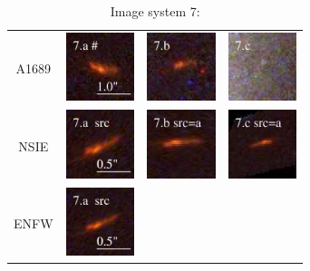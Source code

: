 \documentclass[useAMS,usenatbib]{mn2e}
\begin{document}
\begin{table}
  \caption{Image system 7:}\vspace{0mm}
  \begin{tabular}{cccc}
    \multicolumn{1}{m{1cm}}{{\Large A1689}}
    & \multicolumn{1}{m{1.7cm}}{\includegraphics[height=2.00cm,clip]{figs/nsie_img/rgb.img_7_a.ps}}
    & \multicolumn{1}{m{1.7cm}}{\includegraphics[height=2.00cm,clip]{figs/nsie_img/rgb.img_7_b.ps}}
    & \multicolumn{1}{m{1.7cm}}{\includegraphics[height=2.00cm,clip]{figs/nsie_img/rgb.img_7_c.ps}} \\
    \multicolumn{1}{m{1cm}}{{\Large NSIE}}
    & \multicolumn{1}{m{1.7cm}}{\includegraphics[height=2.00cm,clip]{figs/nsie_img/rgb.src_7_a.ps}}
    & \multicolumn{1}{m{1.7cm}}{\includegraphics[height=2.00cm,clip]{figs/nsie_img/rgb.pre_7_b_a_tri.ps}}
    & \multicolumn{1}{m{1.7cm}}{\includegraphics[height=2.00cm,clip]{figs/nsie_img/rgb.pre_7_c_a_tri.ps}} \\
    \multicolumn{1}{m{1cm}}{{\Large ENFW}}
    & \multicolumn{1}{m{1.7cm}}{\includegraphics[height=2.00cm,clip]{figs/enfw_img/rgb.src_7_a.ps}}

\end{tabular}
\end{table}
\end{document}
